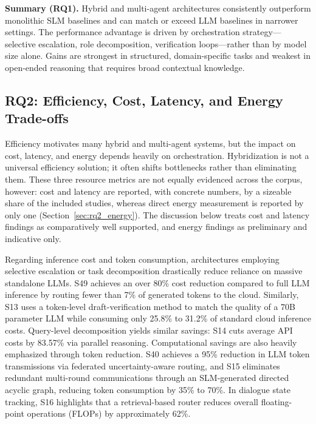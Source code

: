 \noindent\textbf{Summary (RQ1).} Hybrid and multi-agent architectures consistently outperform monolithic SLM baselines and can match or exceed LLM baselines in narrower settings. The performance advantage is driven by orchestration strategy---selective escalation, role decomposition, verification loops---rather than by model size alone. Gains are strongest in structured, domain-specific tasks and weakest in open-ended reasoning that requires broad contextual knowledge.

\subsection{RQ2: Efficiency, Cost, Latency, and Energy Trade-offs}
\label{sec:rq2}

Efficiency motivates many hybrid and multi-agent systems, but the impact on cost, latency, and energy depends heavily on orchestration. Hybridization is not a universal efficiency solution; it often shifts bottlenecks rather than eliminating them. These three resource metrics are not equally evidenced across the corpus, however: cost and latency are reported, with concrete numbers, by a sizeable share of the included studies, whereas direct energy measurement is reported by only one (Section~\ref{sec:rq2_energy}). The discussion below treats cost and latency findings as comparatively well supported, and energy findings as preliminary and indicative only.

Regarding inference cost and token consumption, architectures employing selective escalation or task decomposition drastically reduce reliance on massive standalone LLMs. S49 achieves an over 80\% cost reduction compared to full LLM inference by routing fewer than 7\% of generated tokens to the cloud. Similarly, S13 uses a token-level draft-verification method to match the quality of a 70B parameter LLM while consuming only 25.8\% to 31.2\% of standard cloud inference costs. Query-level decomposition yields similar savings: S14 cuts average API costs by 83.57\% via parallel reasoning. Computational savings are also heavily emphasized through token reduction. S40 achieves a 95\% reduction in LLM token transmissions via federated uncertainty-aware routing, and S15 eliminates redundant multi-round communications through an SLM-generated directed acyclic graph, reducing token consumption by 35\% to 70\%. In dialogue state tracking, S16 highlights that a retrieval-based router reduces overall floating-point operations (FLOPs) by approximately 62\%.

